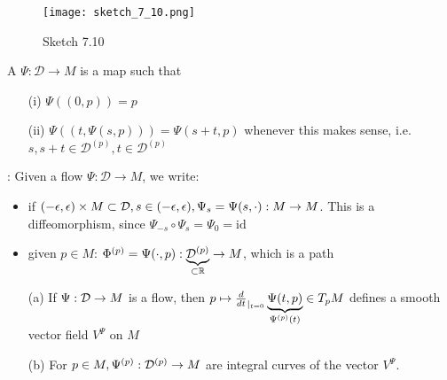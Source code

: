 \begin{example}
    \begin{figure}[H]\label{fig:7.10}
        \centering
        \texttt{[image: sketch\_7\_10.png]}
        \caption{Sketch 7.10}
    \end{figure}
\end{example}

\begin{definition*}
    A  \(\Psi:\mathcal{D}\to M\) is a map such that 
    \begin{enumerate}
        \item[(i)] \(\Psi((0,p))=p\)
        \item[(ii)] \(\Psi((t,\Psi(s,p)))=\Psi(s+t,p)\) whenever this makes sense, i.e. \(s,s+t\in\mathcal{D}^{(p)},t\in \mathcal{D}^{(p)}\)   
    \end{enumerate}
\end{definition*}

: Given a flow \(\Psi:\mathcal{D}\to M\), we write:
\begin{itemize}
    \item if \((-\epsilon,\epsilon)\times M\subset \mathcal{D}, s\in (-\epsilon,\epsilon),\Psi_s=\Psi(s,\cdot):M\to M\). This is a diffeomorphism, since \(\Psi_{-s}\circ \Psi_s=\Psi_0=\text{id}\)
    \item given \(p\in M\): \(\Phi^{(p)}=\Psi(\cdot,p):\underbrace{\mathcal{D}^{(p)}}_{\subset \mathbb{R}}\to M\), which is a path
\end{itemize}

\begin{lemma}\label{lem:7.11}
    \begin{enumerate}
        \item[(a)] If \(\Psi:\mathcal{D}\to M\) is a flow, then \(p\mapsto \frac{d}{dt}_{|_{t=0}}\underbrace{\Psi(t,p)}_{\Psi^{(p)}(t)}\in T_p M\)  defines a smooth vector field \(V^{\Psi}\) on \(M\)
        \item[(b)] For \(p\in M,\Psi^{(p)}:\mathcal{D}^{(p)}\to M\) are integral curves of the vector \(V^{\Psi}\). 
    \end{enumerate}
\end{lemma}

